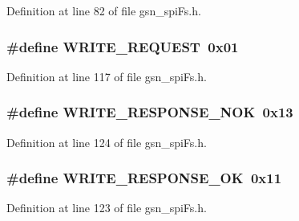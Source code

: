 Definition at line 82 of file gsn\_\-spiFs.h.

\hypertarget{a00589_a3fb6efb4be8a3eb5b2678df5a7033604}{
\subsubsection[{WRITE\_\-REQUEST}]{\setlength{\rightskip}{0pt plus 5cm}\#define WRITE\_\-REQUEST~0x01}}
\label{a00589_a3fb6efb4be8a3eb5b2678df5a7033604}


Definition at line 117 of file gsn\_\-spiFs.h.

\hypertarget{a00589_a176bedef2f7457783034199024e0bd7f}{
\subsubsection[{WRITE\_\-RESPONSE\_\-NOK}]{\setlength{\rightskip}{0pt plus 5cm}\#define WRITE\_\-RESPONSE\_\-NOK~0x13}}
\label{a00589_a176bedef2f7457783034199024e0bd7f}


Definition at line 124 of file gsn\_\-spiFs.h.

\hypertarget{a00589_ae0509361e0d2df95bf9484396f90223d}{
\subsubsection[{WRITE\_\-RESPONSE\_\-OK}]{\setlength{\rightskip}{0pt plus 5cm}\#define WRITE\_\-RESPONSE\_\-OK~0x11}}
\label{a00589_ae0509361e0d2df95bf9484396f90223d}


Definition at line 123 of file gsn\_\-spiFs.h.



